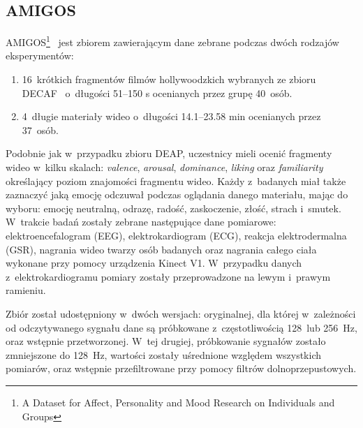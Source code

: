 \subsection{AMIGOS}
AMIGOS\footnote{A Dataset for Affect, Personality and Mood Research on Individuals and Groups}~\cite{amigos_dataset_2017} jest zbiorem zawierającym dane zebrane podczas dwóch rodzajów eksperymentów:
\begin{enumerate}
	\item 16~krótkich fragmentów filmów hollywoodzkich wybranych ze zbioru DECAF~\cite{decaf_dataset_2015} o~długości 51--150 s ocenianych przez grupę 40~osób.
	\item 4~długie materiały wideo o~długości 14.1--23.58 min ocenianych przez 37~osób.
\end{enumerate}
Podobnie jak w~przypadku zbioru DEAP, uczestnicy mieli ocenić fragmenty wideo w~kilku skalach: \textit{valence}, \textit{arousal}, \textit{dominance}, \textit{liking} oraz \textit{familiarity} określający poziom znajomości fragmentu wideo. Każdy z~badanych miał także zaznaczyć jaką emocję odczuwał podczas oglądania danego materiału, mając do wyboru: emocję neutralną, odrazę, radość, zaskoczenie, złość, strach i~smutek. W~trakcie badań zostały zebrane następujące dane pomiarowe: elektroencefalogram (EEG), elektrokardiogram (ECG), reakcja elektrodermalna (GSR), nagrania wideo twarzy osób badanych oraz nagrania całego ciała wykonane przy pomocy urządzenia Kinect V1. W~przypadku danych z~elektrokardiogramu pomiary zostały przeprowadzone na lewym i~prawym ramieniu.

Zbiór został udostępniony w~dwóch wersjach: oryginalnej, dla której w~zależności od odczytywanego sygnału dane są próbkowane z~częstotliwością 128~lub 256~Hz, oraz wstępnie przetworzonej. W~tej drugiej, próbkowanie sygnałów zostało zmniejszone do 128~Hz, wartości zostały uśrednione względem wszystkich pomiarów, oraz wstępnie przefiltrowane przy pomocy filtrów dolnoprzepustowych.

